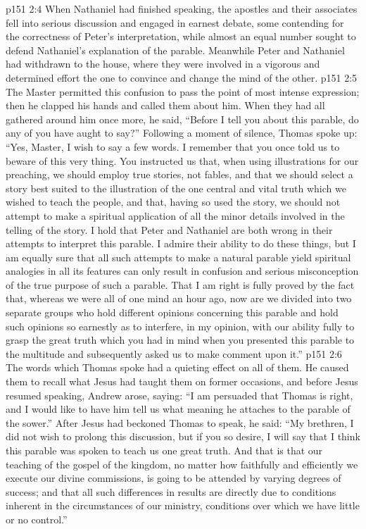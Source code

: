 \vs p151 2:4 When Nathaniel had finished speaking, the apostles and their associates fell into serious discussion and engaged in earnest debate, some contending for the correctness of Peter’s interpretation, while almost an equal number sought to defend Nathaniel’s explanation of the parable. Meanwhile Peter and Nathaniel had withdrawn to the house, where they were involved in a vigorous and determined effort the one to convince and change the mind of the other.
\vs p151 2:5 The Master permitted this confusion to pass the point of most intense expression; then he clapped his hands and called them about him. When they had all gathered around him once more, he said, \textcolor{ubdarkred}{“Before I tell you about this parable, do any of you have aught to say?”} Following a moment of silence, Thomas spoke up: “Yes, Master, I wish to say a few words. I remember that you once told us to beware of this very thing. You instructed us that, when using illustrations for our preaching, we should employ true stories, not fables, and that we should select a story best suited to the illustration of the one central and vital truth which we wished to teach the people, and that, having so used the story, we should not attempt to make a spiritual application of all the minor details involved in the telling of the story. I hold that Peter and Nathaniel are both wrong in their attempts to interpret this parable. I admire their ability to do these things, but I am equally sure that all such attempts to make a natural parable yield spiritual analogies in all its features can only result in confusion and serious misconception of the true purpose of such a parable. That I am right is fully proved by the fact that, whereas we were all of one mind an hour ago, now are we divided into two separate groups who hold different opinions concerning this parable and hold such opinions so earnestly as to interfere, in my opinion, with our ability fully to grasp the great truth which you had in mind when you presented this parable to the multitude and subsequently asked us to make comment upon it.”\plusone
\vs p151 2:6 The words which Thomas spoke had a quieting effect on all of them. He caused them to recall what Jesus had taught them on former occasions, and before Jesus resumed speaking, Andrew arose, saying: “I am persuaded that Thomas is right, and I would like to have him tell us what meaning he attaches to the parable of the sower.” After Jesus had beckoned Thomas to speak, he said: “My brethren, I did not wish to prolong this discussion, but if you so desire, I will say that I think this parable was spoken to teach us one great truth. And that is that our teaching of the gospel of the kingdom, no matter how faithfully and efficiently we execute our divine commissions, is going to be attended by varying degrees of success; and that all such differences in results are directly due to conditions inherent in the circumstances of our ministry, conditions over which we have little or no control.”
